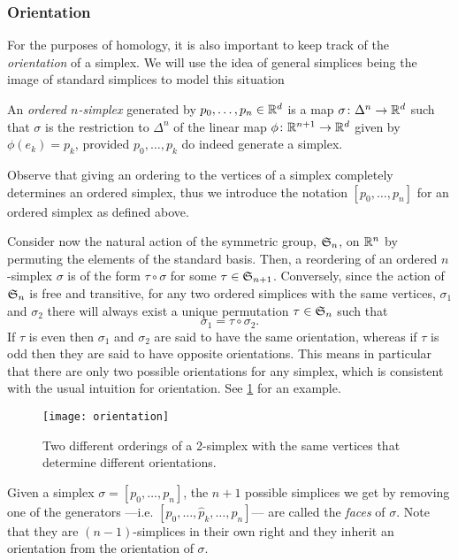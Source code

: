 \documentclass[../main.tex]{subfiles}
\begin{document}
\subsubsection{Orientation}
For the purposes of homology, it is also important to keep track of the \emph{orientation} of a
simplex. We will use the idea of general simplices being the image of standard simplices
to model this situation
\begin{definition}
	An \emph{ordered \( n \)-simplex} generated by \( p_0, \dots, p_n \in \R^d \) is a map
	\( \sigma \colon \Delta^n \to \R^d \) such that \( \sigma \) is the restriction to \(
	\Delta^n \) of the linear map \( \phi \colon \R^{n+1} \to \R^d \) given by \( \phi(e_k)
	= p_k \), provided \( p_0, \dots, p_k \) do indeed generate a simplex. 
\end{definition}
Observe that giving an ordering to the vertices of a simplex completely determines an
ordered simplex, thus we introduce the notation \( [p_0, \dots, p_n] \) for an ordered
simplex as defined above. 

Consider now the natural action of the symmetric group, \( \S_n \), on \( \R^n \) by
permuting the elements of the standard basis. Then, a reordering of an ordered \( n
\)-simplex \( \sigma \) is of the form \( \tau \circ \sigma \) for some \( \tau \in
\S_{n+1} \). Conversely, since the action of \( \S_n \) is free and transitive, for any
two ordered simplices with the same vertices,  \( \sigma_1 \) and \( \sigma_2 \) there
will always exist a unique permutation \( \tau \in \S_n \) such that
\begin{equation*}
	\sigma_1 = \tau \circ \sigma_2.
\end{equation*}
If \( \tau \) is even then \( \sigma_1 \) and \( \sigma_2 \) are said to have the same
orientation, whereas if \( \tau \) is odd then they are said to have opposite
orientations. This means in particular that there are only two possible orientations for
any simplex, which is consistent with the usual intuition for orientation. See
\cref{fig:orientation} for an example. 

\begin{figure}[htb]
	\centering
	\texttt{[image: orientation]}
	\caption{Two different orderings of a 2-simplex with the same vertices that determine
	different orientations.}
	\label{fig:orientation}
\end{figure}

Given a simplex \( \sigma = [p_0, \dots, p_n] \), the \( n+1 \) possible simplices we get by
removing one of the generators ---i.e. \( [p_0, \dots, \hat{p}_k, \dots, p_n] \)--- are called the
\emph{faces} of \( \sigma \). Note that they are \( (n-1) \)-simplices in their own right
and they inherit an orientation from the orientation of \( \sigma \). 
\end{document}
